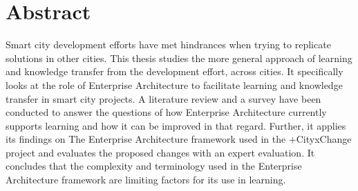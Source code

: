 \chapter*{Abstract}
\iffalse
The \texttt{ntnuthesis} document class is a customised version of the standard \LaTeX{} \texttt{report} document class. It can be used for theses at all levels – bachelor, master and PhD – and is available in English (British and American) and Norwegian (Bokmål and Nynorsk). This document is ment to serve (i) as a description of the document class, (ii) as an example of how to use it, and (iii) as a thesis template.
\fi

Smart city development efforts have met hindrances when trying to replicate solutions in other cities. This thesis studies the more general approach of learning and knowledge transfer from the development effort, across cities. It specifically looks at the role of Enterprise Architecture to facilitate learning and knowledge transfer in smart city projects. A literature review and a survey have been conducted to answer the questions of how Enterprise Architecture currently supports learning and how it can be improved in that regard. Further, it applies its findings on The Enterprise Architecture framework used in the +CityxChange project and evaluates the proposed changes with an expert evaluation. It concludes that  the complexity and terminology used in the Enterprise Architecture framework are limiting factors for its use in learning.